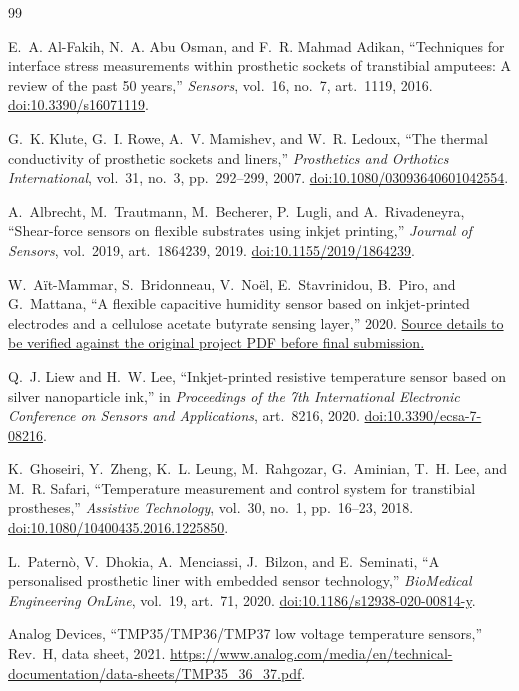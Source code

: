 \documentclass[12pt,a4paper]{article}
\begin{document}
\begin{thebibliography}{99}

E.~A. Al-Fakih, N.~A. Abu Osman, and F.~R. Mahmad Adikan,
``Techniques for interface stress measurements within prosthetic sockets of
transtibial amputees: A review of the past 50 years,''
\textit{Sensors}, vol.~16, no.~7, art.~1119, 2016.
\href{https://doi.org/10.3390/s16071119}{doi:10.3390/s16071119}.

G.~K. Klute, G.~I. Rowe, A.~V. Mamishev, and W.~R. Ledoux,
``The thermal conductivity of prosthetic sockets and liners,''
\textit{Prosthetics and Orthotics International}, vol.~31, no.~3,
pp.~292--299, 2007.
\href{https://doi.org/10.1080/03093640601042554}
{doi:10.1080/03093640601042554}.

A.~Albrecht, M.~Trautmann, M.~Becherer, P.~Lugli, and A.~Rivadeneyra,
``Shear-force sensors on flexible substrates using inkjet printing,''
\textit{Journal of Sensors}, vol.~2019, art.~1864239, 2019.
\href{https://doi.org/10.1155/2019/1864239}
{doi:10.1155/2019/1864239}.

W.~Aït-Mammar, S.~Bridonneau, V.~Noël, E.~Stavrinidou, B.~Piro, and
G.~Mattana,
``A flexible capacitive humidity sensor based on inkjet-printed electrodes
and a cellulose acetate butyrate sensing layer,''
2020.
\href{https://doi.org/10.3390/ecsa-7-08216}
{Source details to be verified against the original project PDF before final
submission.}

Q.~J. Liew and H.~W. Lee,
``Inkjet-printed resistive temperature sensor based on silver nanoparticle
ink,''
in \textit{Proceedings of the 7th International Electronic Conference on
Sensors and Applications}, art.~8216, 2020.
\href{https://doi.org/10.3390/ecsa-7-08216}
{doi:10.3390/ecsa-7-08216}.

K.~Ghoseiri, Y.~Zheng, K.~L. Leung, M.~Rahgozar, G.~Aminian,
T.~H. Lee, and M.~R. Safari,
``Temperature measurement and control system for transtibial prostheses,''
\textit{Assistive Technology}, vol.~30, no.~1, pp.~16--23, 2018.
\href{https://doi.org/10.1080/10400435.2016.1225850}
{doi:10.1080/10400435.2016.1225850}.

L.~Paternò, V.~Dhokia, A.~Menciassi, J.~Bilzon, and E.~Seminati,
``A personalised prosthetic liner with embedded sensor technology,''
\textit{BioMedical Engineering OnLine}, vol.~19, art.~71, 2020.
\href{https://doi.org/10.1186/s12938-020-00814-y}
{doi:10.1186/s12938-020-00814-y}.

Analog Devices,
``TMP35/TMP36/TMP37 low voltage temperature sensors,'' Rev.~H,
data sheet, 2021.
\url{https://www.analog.com/media/en/technical-documentation/data-sheets/TMP35_36_37.pdf}.

\end{thebibliography}
\end{document}
